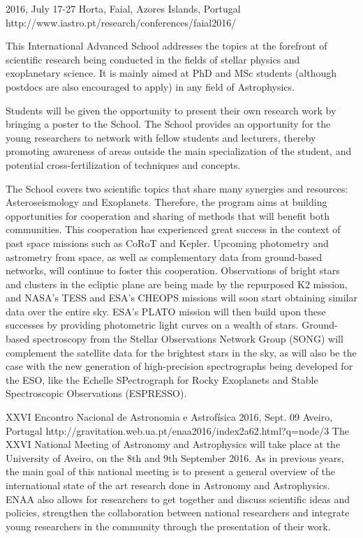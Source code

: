 {2016, July 17-27}%
{Horta, Faial, Azores Islands, Portugal}%
{http://www.iastro.pt/research/conferences/faial2016/}%
{}%
{This International Advanced School addresses the topics at the forefront of scientific research being conducted in the fields of stellar physics and exoplanetary science. It is mainly aimed at PhD and MSc students (although postdocs are also encouraged to apply) in any field of Astrophysics.
    
Students will be given the opportunity to present their own research work by bringing a poster to the School. The School provides an opportunity for the young researchers to network with fellow students and lecturers, thereby promoting awareness of areas outside the main specialization of the student, and potential cross-fertilization of techniques and concepts.
    
The School covers two scientific topics that share many synergies and resources: Asteroseismology and Exoplanets. Therefore, the program aims at building opportunities for cooperation and sharing of methods that will benefit both communities. This cooperation has experienced great success in the context of past space missions such as CoRoT and Kepler. Upcoming photometry and astrometry from space, as well as complementary data from ground-based networks, will continue to foster this cooperation. Observations of bright stars and clusters in the ecliptic plane are being made by the repurposed K2 mission, and NASA's TESS and ESA's CHEOPS missions will soon start obtaining similar data over the entire sky. ESA's PLATO mission will then build upon these successes by providing photometric light curves on a wealth of stars. Ground-based spectroscopy from the Stellar Observations Network Group (SONG) will complement the satellite data for the brightest stars in the sky, as will also be the case with the new generation of high-precision spectrographs being developed for the ESO, like the Echelle SPectrograph for Rocky Exoplanets and Stable Spectroscopic Observations (ESPRESSO).}%

 {XXVI Encontro Nacional de Astronomia e Astrofísica}%
{2016, Sept. 09}%
{Aveiro, Portugal}%
{http://gravitation.web.ua.pt/enaa2016/index2a62.html?q=node/3}%
{}%
{The XXVI National Meeting of Astronomy and Astrophysics will take place at the University of Aveiro, on the 8th and 9th September 2016. As in previous years, the main goal of this national meeting is to present a general overview of the international state of the art research done in Astronomy and Astrophysics. ENAA also allows for researchers to get together and discuss scientific ideas and policies, strengthen the collaboration between national researchers and integrate young researchers in the community through the presentation of their work.}


